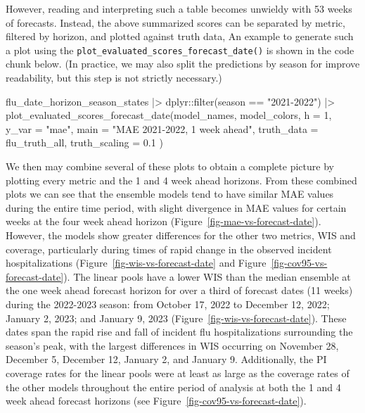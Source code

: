 \documentclass[
]{article}
\newenvironment{Shaded}{\begin{snugshade}}{\end{snugshade}}
\newcommand{\AttributeTok}[1]{\textcolor[rgb]{0.40,0.45,0.13}{#1}}
\newcommand{\DecValTok}[1]{\textcolor[rgb]{0.68,0.00,0.00}{#1}}
\newcommand{\FloatTok}[1]{\textcolor[rgb]{0.68,0.00,0.00}{#1}}
\newcommand{\FunctionTok}[1]{\textcolor[rgb]{0.28,0.35,0.67}{#1}}
\newcommand{\NormalTok}[1]{\textcolor[rgb]{0.00,0.23,0.31}{#1}}
\newcommand{\SpecialCharTok}[1]{\textcolor[rgb]{0.37,0.37,0.37}{#1}}
\newcommand{\StringTok}[1]{\textcolor[rgb]{0.13,0.47,0.30}{#1}}
\begin{document}
However, reading and interpreting such a table becomes unwieldy with 53
weeks of forecasts. Instead, the above summarized scores can be
separated by metric, filtered by horizon, and plotted against truth
data, An example to generate such a plot using the
\texttt{plot\_evaluated\_scores\_forecast\_date()} is shown in the code
chunk below. (In practice, we may also split the predictions by season
for improve readability, but this step is not strictly necessary.)

\begin{Shaded}
\begin{Highlighting}[]
\NormalTok{flu\_date\_horizon\_season\_states }\SpecialCharTok{|\textgreater{}}
\NormalTok{  dplyr}\SpecialCharTok{::}\FunctionTok{filter}\NormalTok{(season }\SpecialCharTok{==} \StringTok{"2021{-}2022"}\NormalTok{) }\SpecialCharTok{|\textgreater{}}
  \FunctionTok{plot\_evaluated\_scores\_forecast\_date}\NormalTok{(model\_names, model\_colors,}
    \AttributeTok{h =} \DecValTok{1}\NormalTok{,}
    \AttributeTok{y\_var =} \StringTok{"mae"}\NormalTok{,}
    \AttributeTok{main =} \StringTok{"MAE 2021{-}2022, 1 week ahead"}\NormalTok{,}
    \AttributeTok{truth\_data =}\NormalTok{ flu\_truth\_all,}
    \AttributeTok{truth\_scaling =} \FloatTok{0.1}
\NormalTok{  )}
\end{Highlighting}
\end{Shaded}

We then may combine several of these plots to obtain a complete picture
by plotting every metric and the 1 and 4 week ahead horizons. From these
combined plots we can see that the ensemble models tend to have similar
MAE values during the entire time period, with slight divergence in MAE
values for certain weeks at the four week ahead horizon
(Figure~\ref{fig-mae-vs-forecast-date}). However, the models show
greater differences for the other two metrics, WIS and coverage,
particularly during times of rapid change in the observed incident
hospitalizations (Figure~\ref{fig-wis-vs-forecast-date} and
Figure~\ref{fig-cov95-vs-forecast-date}). The linear pools have a lower
WIS than the median ensemble at the one week ahead forecast horizon for
over a third of forecast dates (11 weeks) during the 2022-2023 season:
from October 17, 2022 to December 12, 2022; January 2, 2023; and January
9, 2023 (Figure~\ref{fig-wis-vs-forecast-date}). These dates span the
rapid rise and fall of incident flu hospitalizations surrounding the
season's peak, with the largest differences in WIS occurring on November
28, December 5, December 12, January 2, and January 9. Additionally, the
PI coverage rates for the linear pools were at least as large as the
coverage rates of the other models throughout the entire period of
analysis at both the 1 and 4 week ahead forecast horizons (see
Figure~\ref{fig-cov95-vs-forecast-date}).
\end{document}
